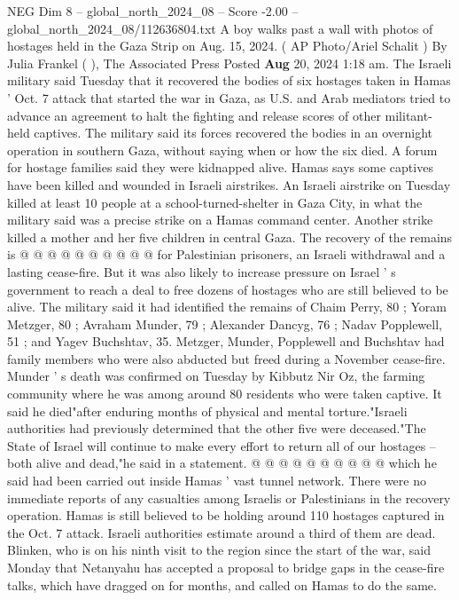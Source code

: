 \begin{textsample}{NEG Dim 8 – global\_north\_2024\_08 – Score -2.00 – global\_north\_2024\_08/112636804.txt}  \label{ex:f8_neg_118}
A boy walks past a wall with photos of hostages held in the Gaza Strip on Aug. 15, 2024. ( AP Photo/Ariel Schalit ) By Julia Frankel ( ), The Associated Press Posted \textbf{Aug} 20, 2024 1:18 am.
The Israeli military said Tuesday that it recovered the bodies of six hostages taken in Hamas ' Oct. 7 attack that started the war in Gaza, as U.S. and Arab mediators tried to advance an agreement to halt the fighting and release scores of other militant-held captives.
The military said its forces recovered the bodies in an overnight operation in southern Gaza, without saying when or how the six died.
A forum for hostage families said they were kidnapped alive.
Hamas says some captives have been killed and wounded in Israeli airstrikes.
An Israeli airstrike on Tuesday killed at least 10 people at a school-turned-shelter in Gaza City, in what the military said was a precise strike on a Hamas command center.
Another strike killed a mother and her five children in central Gaza.
The recovery of the remains is @ @ @ @ @ @ @ @ @ @ for Palestinian prisoners, an Israeli withdrawal and a lasting cease-fire.
But it was also likely to increase pressure on Israel ' s government to reach a deal to free dozens of hostages who are still believed to be alive.
The military said it had identified the remains of Chaim Perry, 80 ; Yoram Metzger, 80 ; Avraham Munder, 79 ; Alexander Dancyg, 76 ; Nadav Popplewell, 51 ; and Yagev Buchshtav, 35.
Metzger, Munder, Popplewell and Buchshtav had family members who were also abducted but freed during a November cease-fire.
Munder ' s death was confirmed on Tuesday by Kibbutz Nir Oz, the farming community where he was among around 80 residents who were taken captive.
It said he died"after enduring months of physical and mental torture."Israeli authorities had previously determined that the other five were deceased."The State of Israel will continue to make every effort to return all of our hostages -- both alive and dead,"he said in a statement. @ @ @ @ @ @ @ @ @ @ which he said had been carried out inside Hamas ' vast tunnel network.
There were no immediate reports of any casualties among Israelis or Palestinians in the recovery operation.
Hamas is still believed to be holding around 110 hostages captured in the Oct. 7 attack.
Israeli authorities estimate around a third of them are dead.
Blinken, who is on his ninth visit to the region since the start of the war, said Monday that Netanyahu has accepted a proposal to bridge gaps in the cease-fire talks, which have dragged on for months, and called on Hamas to do the same.

\end{textsample}

